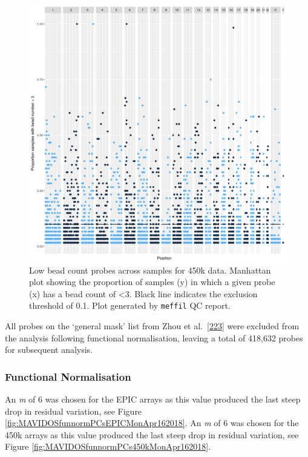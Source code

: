 \documentclass[
]{book}
\begin{document}
\begin{figure}

{\centering \includegraphics[width=0.8\linewidth]{figs/MAVIDOSqc450kbeadNumAcross} 

}

\caption{Low bead count probes across samples for 450k data. Manhattan plot showing the proportion of samples (y) in which a given probe (x) has a bead count of \textless3. Black line indicates the exclusion threshold of 0.1. Plot generated by \texttt{meffil} QC report.}\label{fig:MAVIDOSqc450kbeadNumAcross}
\end{figure}



All probes on the `general mask' list from Zhou et al.~{[}\protect\hyperlink{ref-Zhou2017}{223}{]} were excluded from the analysis following functional normalisation, leaving a total of 418,632 probes for subsequent analysis.

\hypertarget{functional-normalisation-1}{%
\subsubsection{Functional Normalisation}\label{functional-normalisation-1}}

An \emph{m} of 6 was chosen for the EPIC arrays as this value produced the last steep drop in residual variation, see Figure \ref{fig:MAVIDOSfunnormPCsEPICMonApr162018}.
An \emph{m} of 6 was chosen for the 450k arrays as this value produced the last steep drop in residual variation, see Figure \ref{fig:MAVIDOSfunnormPCs450kMonApr162018}.
\end{document}
